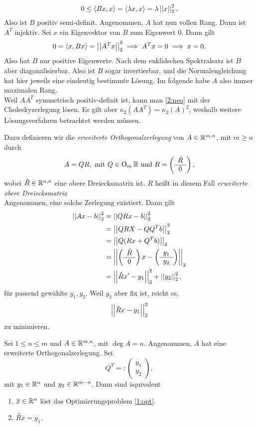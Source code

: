 \[
0\leq \langle Bx,x\rangle  = \langle \lambda x,x\rangle = \lambda \left|\left|x\right|\right|_2^2.
\]
Also ist $B$ positiv semi-definit. Angenommen, $A$ hat nun vollen Rang. Dann ist $A^T$ injektiv. Sei $x$ ein Eigenvektor von $B$ zum Eigenwert $0$. Dann gilt
\[
0 = \langle x,Bx\rangle = \left|\left|A^Tx\right|\right|_2^2\implies A^Tx=0\implies x=0.
\]
Also hat $B$ nur positive Eigenwerte. Nach dem euklidschen Spektralsatz \cite[20.25]{schroer} ist $B$ aber diagonalisierbar. Also ist $B$ sogar invertierbar,
\color{black} und die Normalengleichung hat hier jeweils eine eindeutig bestimmte Lösung. Im folgende habe $A$ also immer maximalen Rang.\\
Weil $AA^T$ symmetrisch positiv-definit ist, kann man \eqref{2:neq} mit der Choleskyzerlegung lösen. Es gilt aber $\kappa_2(AA^T)=\kappa_2(A)^2$, weshalb weitere Lösungsverfahren betrachtet werden müssen.\par
Dazu definieren wir die \emph{erweiterte Orthogonalzerlegung}  von $A\in \mathbb{R}^{m,n}$, mit $m\geq n$ durch
\[
A = QR,~\text{mit }Q\in \operatorname{O}_m{\mathbb{R}}~\text{und}~R=\left(\begin{array}{c}\hat{R}\\\hline 0\end{array}\right),
\]
wobei $\hat{R}\in \mathbb{R}^{n,n}$ eine obere Dreiecksmatrix ist. $R$ heißt in diesem Fall \emph{erweiterte obere Dreiecksmatrix} \\
Angenommen, eine solche Zerlegung existiert. Dann gilt
\begin{align*}
  \left|\left|Ax-b\right|\right|_2^2&= \left|\left|QRx-b\right|\right|_2^2\\
  &=\left|\left|QRX-QQ^Tb\right|\right|_2^2\\
  &= \left|\left|Q(Rx+Q^Tb)\right|\right|_2\\
  &= \left|\left|\left(\begin{array}{c}\hat{R}\\\hline0\end{array}\right)x-\left(\begin{array}{c}y_1\\\hline y_2\end{array}\right)\right|\right|_2\\
  &= \left|\left|\hat{R}x'-y_1\right|\right|_2^2+\left|\left|y_2\right|\right|_2^2,
\end{align*}
für passend gewählte $y_1,y_2$. Weil $y_2$ aber fix ist, reicht es,
\[
\left|\left|\hat{R}x-y_1\right|\right|_2^2
\]
zu minimieren.
\begin{thm}
  Sei $1\leq n \leq m$ und $A\in \mathbb{R}^{m,n}$, mit $\deg A = n$. Angenommen, $A$ hat eine erweiterte Orthogonalzerlegung. Sei
  \[
  Q^T=:\left( \begin{array}{c} y_1\\\hline y_2\end{array}\right),
  \]
  mit $y_1\in \mathbb{R}^{n}$ und $y_2\in \mathbb{R}^{m-n}$. Dann sind äquivalent
  \begin{enumerate}
    \item $\overline{x}\in \mathbb{R}^n$ löst das Optimierungsproblem \eqref{1:opt}.
    \item $\hat{R}x=y_1$.
  \end{enumerate}
\end{thm}
